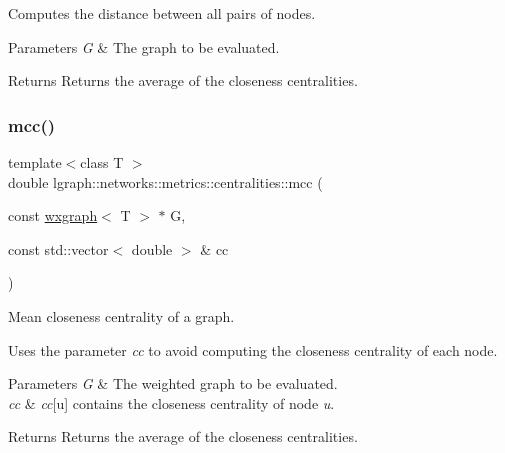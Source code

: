 Computes the distance between all pairs of nodes. 
\begin{DoxyParams}{Parameters}
{\em G} & The graph to be evaluated. \\
\hline
\end{DoxyParams}
\begin{DoxyReturn}{Returns}
Returns the average of the closeness centralities. 
\end{DoxyReturn}
\mbox{\label{namespacelgraph_1_1networks_1_1metrics_1_1centralities_af66da53eb48ccb2982bd97246a651f00}} 
\subsubsection{\texorpdfstring{mcc()}{mcc()}\hspace{0.1cm}{\footnotesize\ttfamily [3/4]}}
{\footnotesize\ttfamily template$<$class T $>$ \\
double lgraph\+::networks\+::metrics\+::centralities\+::mcc (\begin{DoxyParamCaption}\item[{const \hyperlink{classlgraph_1_1wxgraph}{wxgraph}$<$ T $>$ $\ast$}]{G,  }\item[{const std\+::vector$<$ double $>$ \&}]{cc }\end{DoxyParamCaption})}



Mean closeness centrality of a graph. 

Uses the parameter {\itshape cc} to avoid computing the closeness centrality of each node.


\begin{DoxyParams}{Parameters}
{\em G} & The weighted graph to be evaluated. \\
\hline
{\em cc} & {\itshape cc}\mbox{[}u\mbox{]} contains the closeness centrality of node {\itshape u}. \\
\hline
\end{DoxyParams}
\begin{DoxyReturn}{Returns}
Returns the average of the closeness centralities. 
\end{DoxyReturn}
\mbox{\label{namespacelgraph_1_1networks_1_1metrics_1_1centralities_add884e5cdd51eed7c46e064338361ee6}} 
